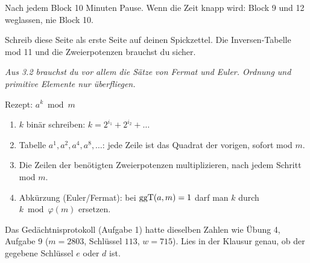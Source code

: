 \medskip
Nach jedem Block 10 Minuten Pause. Wenn die Zeit knapp wird: Block 9 und 12 weglassen, nie Block 10.

\tableofcontents

\aufschreiben
Schreib diese Seite als erste Seite auf deinen Spickzettel. Die Inversen-Tabelle mod 11 und die Zweierpotenzen brauchst du sicher.\par\medskip
{}

\lesen
{}
\textit{Aus 3.2 brauchst du vor allem die Sätze von Fermat und Euler. Ordnung und primitive Elemente nur überfliegen.}

\aufschreiben
\begin{rezept}{Rezept: $a^k \bmod m$}
\begin{enumerate}
\item $k$ binär schreiben: $k = 2^{i_1} + 2^{i_2} + \dots$
\item Tabelle $a^1, a^2, a^4, a^8, \dots$: jede Zeile ist das Quadrat der vorigen, sofort mod $m$.
\item Die Zeilen der benötigten Zweierpotenzen multiplizieren, nach jedem Schritt mod $m$.
\item Abkürzung (Euler/Fermat): bei $\operatorname{ggT}(a, m) = 1$ darf man $k$ durch $k \bmod \varphi(m)$ ersetzen.
\end{enumerate}
\end{rezept}

\ueben
{}

\loesungen
{}

\lesen
{}

\aufschreiben
{}

\ueben
{}
\begin{bemerkung}
Das Gedächtnisprotokoll (Aufgabe 1) hatte dieselben Zahlen wie Übung 4, Aufgabe 9 ($m = 2803$, Schlüssel $113$, $w = 715$).
Lies in der Klausur genau, ob der gegebene Schlüssel $e$ oder $d$ ist.
\end{bemerkung}


